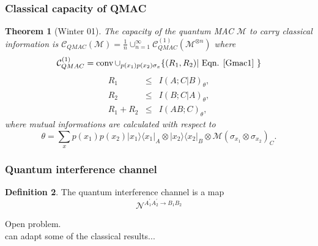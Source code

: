 \documentclass[12pt]{beamer}
\newcommand{\mcal}{\mathcal}
\newcommand{\bra}[1]{\langle #1|}
\newcommand{\ket}[1]{|#1 \rangle}
\newcommand{\ketbra}[1]{\ket{#1}\bra{#1}}
\newcommand{\be}{\begin{equation}}
\newcommand{\ee}{\end{equation}}
\newcommand{\bea}{\begin{eqnarray}}
\newcommand{\eea}{\end{eqnarray}}
\theoremstyle{plain}
\newtheorem{Th}{Theorem}[section]
\theoremstyle{definition}
\newtheorem{Def}[Th]{Definition}
\begin{document}
\begin{frame}
	\frametitle{Classical capacity of QMAC }

		\begin{Th}[Winter 01]
		The capacity of the quantum MAC $\mcal{M}$ to carry classical information is 
		$\mcal{C}_{QMAC}(\mcal{M}) = \frac{1}{n} \cup_{n=1}^\infty \mcal{C}^{(1)}_{QMAC}(\mcal{M}^{\otimes n})$ where 
	        \be
	        		\mcal{C}^{(1)}_{QMAC}  = \operatorname{conv} \cup_{p(x_1)p(x_2)\sigma_x} \{ (R_1,R_2) | \text{ Eqn. \eqref{Gmac1} } \}  \label{region:G_MAC1}
	        \ee
	        \bea
	            R_1         &\leq&      I(A;C|B)_\theta, \nonumber \\
	            R_2         &\leq&      I(B;C|A)_\theta, \label{Gmac1} \\
	            R_1 +R_2    &\leq&      I(AB;C)_\theta, \nonumber
	        \eea 
	        where mutual informations are calculated with respect to 
		\be
			\theta = \sum_x p(x_1)p(x_2) \ketbra{x_1}_A \otimes \ketbra{x_2}_B \otimes \mcal{M}\!({\sigma_{x_1}} \otimes \sigma_{x_2} )_C.
		\ee
		\end{Th}    
		
\end{frame}


%

%		





\begin{frame}
	\frametitle{Quantum interference channel}
    
	
	\begin{Def}
		The quantum interference channel is a map
		\be
			 \mathcal{N}^{A_{1}^{\prime}A_{2}^{\prime}\rightarrow B_{1}B_{2}}
		\ee	
	
	\end{Def}
	
	
    	Open problem. \\


	can adapt some of the classical results...
	
\end{frame}
\end{document}

